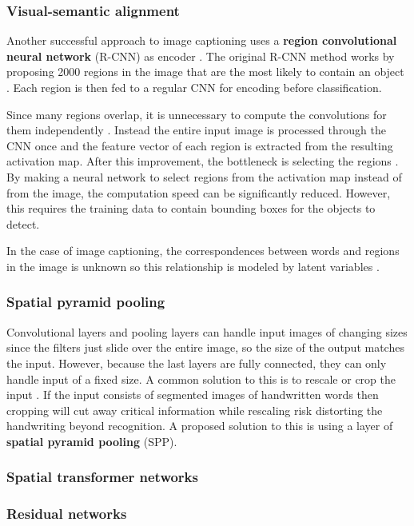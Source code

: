 \subsubsection{Visual-semantic alignment}


Another successful approach to image captioning uses a \textbf{region convolutional neural network} (R-CNN) as encoder \cite{VisualSemanticAlignment}.
The original R-CNN method works by proposing 2000 regions in the image that are the most likely to contain an object \cite{RCNN}. Each region is then fed to a regular CNN for encoding before classification.

Since many regions overlap, it is unnecessary to compute the convolutions for them independently \cite{FastRCNN}. Instead the entire input image is processed through the CNN once and the feature vector of each region is extracted from the resulting activation map. After this improvement, the bottleneck is selecting the regions \cite{FasterRCNN}. By making a neural network to select regions from the activation map instead of from the image, the computation speed can be significantly reduced. However, this requires the training data to contain bounding boxes for the objects to detect.

In the case of image captioning, the correspondences between words and regions in the image is unknown so this relationship is modeled by latent variables \cite{VisualSemanticAlignment}.

\subsubsection{Spatial pyramid pooling}

Convolutional layers and pooling layers can handle input images of changing sizes since the filters just slide over the entire image, so the size of the output matches the input.
However, because the last layers are fully connected, they can only handle input of a fixed size. A common solution to this is to rescale or crop the input \cite{FornesCnnCategorization}. If the input consists of segmented images of handwritten words then cropping will cut away critical information while rescaling risk distorting the handwriting beyond recognition. A proposed solution to this is using a layer of \textbf{spatial pyramid pooling} (SPP).

\subsubsection{Spatial transformer networks}


\subsubsection{Residual networks}

